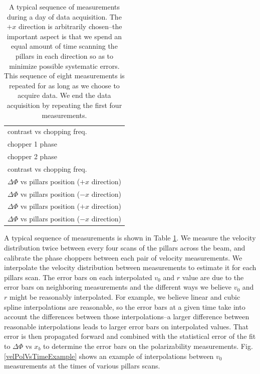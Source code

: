\documentclass[twocolumn,prl,showpacs,superscriptaddress]{revtex4-1}   %
\newcommand{\figref}[1]{Fig. \ref{#1}}
\begin{document}
\begingroup
\begin{table}
\caption{\label{schedule}A typical sequence of measurements during a day of data acquisition. The $+x$ direction is arbitrarily chosen--the important aspect is that we spend an equal amount of time scanning the pillars in each direction so as to minimize possible systematic errors. This sequence of eight measurements is repeated for as long as we choose to acquire data. We end the data acquisition by repeating the first four measurements.}
\begin{center}
\begin{tabular}{l}
\hline
contrast vs chopping freq. \\
chopper 1 phase \\
chopper 2 phase \\
contrast vs chopping freq. \\
$\Delta\Phi$ vs pillars position ($+x$ direction) \\
$\Delta\Phi$ vs pillars position ($-x$ direction) \\
$\Delta\Phi$ vs pillars position ($+x$ direction) \\
$\Delta\Phi$ vs pillars position ($-x$ direction) \\
\hline
\end{tabular}
\end{center}
\end{table}
\endgroup

A typical sequence of measurements is shown in Table \ref{schedule}.
We measure the velocity distribution twice between every four scans of the pillars across the beam, and calibrate the phase choppers between each pair of velocity measurements.
We interpolate the velocity distribution between measurements to estimate it for each pillars scan. The error bars on each interpolated $v_0$ and $r$ value are due to the error bars on neighboring measurements and the different ways we believe $v_0$ and $r$ might be reasonably interpolated. For example, we believe linear and cubic spline interpolations are reasonable, so the error bars at a given time take into account the differences between those interpolations--a larger difference between reasonable interpolations leads to larger error bars on interpolated values. That error is then propagated forward and combined with the statistical error of the fit to $\Delta\Phi$ vs $x_b$ to determine the error bars on the polarizability measurements. \figref{velPolVsTimeExample} shows an example of interpolations between $v_0$ measurements at the times of various pillars scans.
\end{document}
